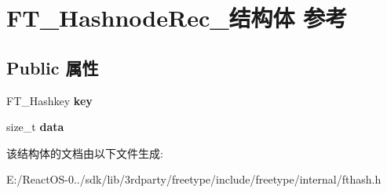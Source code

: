 \hypertarget{struct_f_t___hashnode_rec__}{}\section{F\+T\+\_\+\+Hashnode\+Rec\+\_\+结构体 参考}
\label{struct_f_t___hashnode_rec__}
\subsection*{Public 属性}
\begin{DoxyCompactItemize}
\item 
\mbox{\label{struct_f_t___hashnode_rec___ae03198e910a7336a73279ff26cbf79f2}} 
F\+T\+\_\+\+Hashkey {\bfseries key}
\item 
\mbox{\label{struct_f_t___hashnode_rec___a0aa3571640293bf5153b600eadeb0eab}} 
size\+\_\+t {\bfseries data}
\end{DoxyCompactItemize}


该结构体的文档由以下文件生成\+:\begin{DoxyCompactItemize}
\item 
E\+:/\+React\+O\+S-\/0../sdk/lib/3rdparty/freetype/include/freetype/internal/fthash.\+h\end{DoxyCompactItemize}
